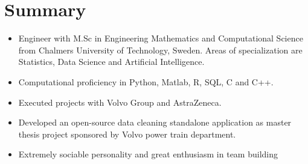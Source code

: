 \documentclass[letterpaper]{templatecv} %
\begin{document}
\makeprofile %
\section{Summary}
\begin{itemize}
    \item Engineer with M.Sc in Engineering Mathematics and Computational Science from Chalmers University of Technology, Sweden. Areas of specialization are Statistics, Data Science and Artificial Intelligence.
\item Computational proficiency in Python, Matlab, R, SQL, C and C++.
\item Executed projects with Volvo Group and AstraZeneca.
\item Developed an open-source data cleaning standalone application as master thesis project sponsored by Volvo power train department.
\item Extremely sociable personality and great enthusiasm in team building
\end{itemize}
 

\end{document}
